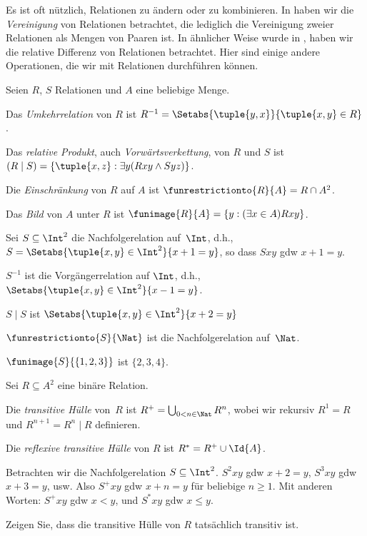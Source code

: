 \documentclass[../../../include/open-logic-section]{subfiles}
\begin{document}

Es ist oft nützlich, Relationen zu ändern oder zu kombinieren. In
 haben wir die \emph{Vereinigung}
von Relationen betrachtet, die lediglich die Vereinigung zweier Relationen als
Mengen von Paaren ist. In ähnlicher Weise wurde in ,
haben wir die relative Differenz von Relationen betrachtet. Hier sind einige
andere Operationen, die wir mit Relationen durchführen können.

\begin{defn} 
Seien $R$, $S$ Relationen und $A$ eine beliebige Menge. 

Das \emph{Umkehrrelation} von $R$ ist $R^{-1} = \Setabs{\tuple{y, x}}{\tuple{x,
    y} \in R}$.

Das \emph{relative Produkt}, auch \emph{Vorwärtsverkettung}, von $R$ und $S$ ist $(R \mid S) =
\{\tuple{x, z} : \exists y(Rxy \land Syz)\}$.

Die \emph{Einschränkung} von $R$ auf $A$ ist $\funrestrictionto{R}{A}= R
\cap A^2$.

Das \emph{Bild} von $A$ unter $R$ ist $\funimage{R}{A} = \{y :
(\exists x \in A)Rxy\}$.
\end{defn}

\begin{ex}
Sei $S \subseteq \Int^2$ die Nachfolgerelation auf~$\Int$, d.h.,
$S = \Setabs{\tuple{x, y} \in \Int^2}{x + 1 = y}$, so dass $Sxy$ gdw $x + 1 = y$.

$S^{-1}$ ist die Vorgängerrelation auf $\Int$, d.h.,
$\Setabs{\tuple{x,y}\in\Int^2}{x -1 =y}$.

$S\mid S$ ist 
$ \Setabs{\tuple{x,y}\in\Int^2}{x + 2 =y}$

$\funrestrictionto{S}{\Nat}$ ist die Nachfolgerelation auf~$\Nat$.

$\funimage{S}{\{1,2,3\}}$ ist $\{2, 3, 4\}$.
\end{ex}

\begin{defn}Sei $R \subseteq A^2$ eine binäre Relation. 
	
Die \emph{transitive Hülle} von~$R$ ist $R^+ = \bigcup_{0 < n \in
\Nat} R^n$, wobei wir rekursiv $R^1 = R$ und $R^{n+1} = R^n
\mid R$ definieren.

Die \emph{reflexive transitive Hülle} von $R$ ist $R^* = R^+ \cup
\Id{A}$.
\end{defn}

\begin{ex}
Betrachten wir die Nachfolgerelation $S \subseteq \Int^2$. $S^2xy$ gdw $x + 2 =
y$, $S^3xy$ gdw $x + 3 = y$, usw. Also $S^+xy$ gdw $x + n = y$ für beliebige
$n \geq 1$. Mit anderen Worten: $S^+xy$ gdw $x < y$, und $S^*xy$ gdw $x \le
y$.
\end{ex}

\begin{prob}
Zeigen Sie, dass die transitive Hülle von $R$ tatsächlich transitiv ist.
\end{prob}
\end{document}
